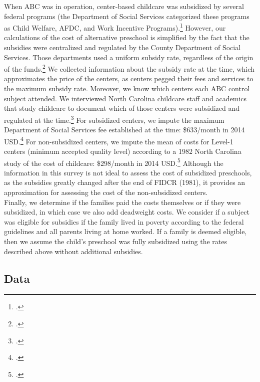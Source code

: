 \begin{appendices}
\noindent When ABC was in operation, center-based childcare was subsidized by several federal programs (the Department of Social Services categorized these programs as Child Welfare, AFDC, and Work Incentive Programs).\footnote{\citet{NC-State-Dept_1972_Licensed-Day-Care}.} However, our calculations of the cost of alternative preschool is simplified by the fact that the subsidies were centralized and regulated by the County Department of Social Services. Those departments used a uniform subsidy rate, regardless of the origin of the funds.\footnote{\citet{Ad-Hoc-NC_1974_Letter}.} We collected information about the subsidy rate at the time, which approximates the price of the centers, as centers pegged their fees and services to the maximum subsidy rate. Moreover, we know which centers each ABC control subject attended. We interviewed North Carolina childcare staff and academics that study childcare to document which of those centers were subsidized and regulated at the time.\footnote{\citet{Kuperman_2015_Clifford-Russell-Interview,Kuperman-Hojman_2015_Hodgers-Interview}.} For subsidized centers, we impute the maximum Department of Social Services fee established at the time: \$633/month in 2014 USD.\footnote{\citet{Ad-Hoc-NC_1974_Letter,Comm-Plan-Serv_1973_Durhams-Share}.} For non-subsidized centers, we impute the mean of costs for Level-1 centers (minimum accepted quality level) according to a 1982 North Carolina study of the cost of childcare: \$298/month in 2014 USD.\footnote{\citet{NC-Admin-Branch_1982_Day-Care-Cost-Study}.} Although the information in this survey is not ideal to assess the cost of subsidized preschools, as the subsidies greatly changed after the end of FIDCR (1981), it provides an approximation for assessing the cost of the non-subsidized centers. \\

\noindent Finally, we determine if the families paid the costs themselves or if they were subsidized, in which case we also add deadweight costs. We consider if a subject was eligible for subsidies if the family lived in poverty according to the federal guidelines and all parents living at home worked. If a family is deemed eligible, then we assume the child's preschool was fully subsidized using the rates described above without additional subsidies. \\

\subsection{Data} \label{appendix:data}


\end{appendices}
